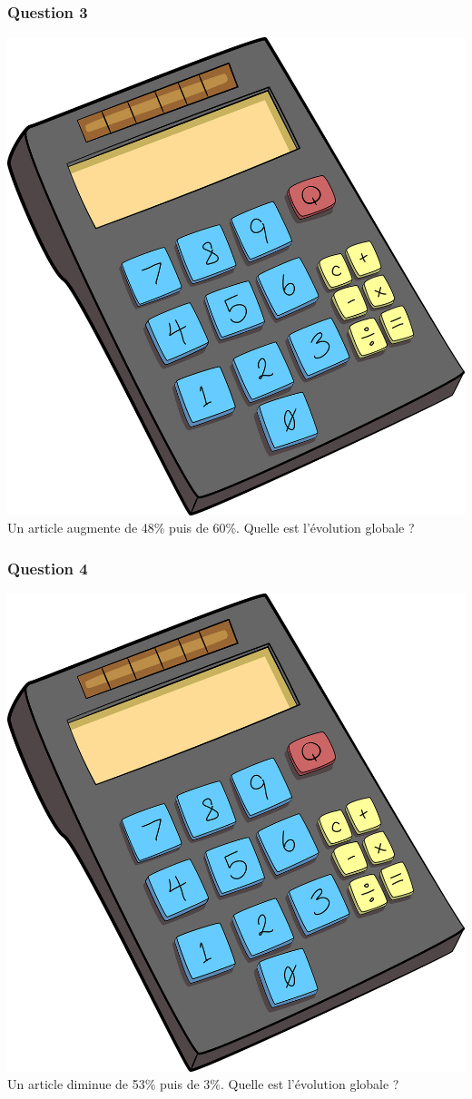 \documentclass[15pt, mathserif]{beamer}
\begin{document}
\begin{frame} 
	\frametitle{Question 3}
\includegraphics[scale=0.01]{calculatrice} Un article augmente de 48\% puis de 60\%. Quelle est l'évolution globale ?\end{frame}


\begin{frame} 
	\frametitle{Question 4}
\includegraphics[scale=0.01]{calculatrice} Un article diminue de 53\% puis de 3\%. Quelle est l'évolution globale ?\end{frame}
\end{document}
